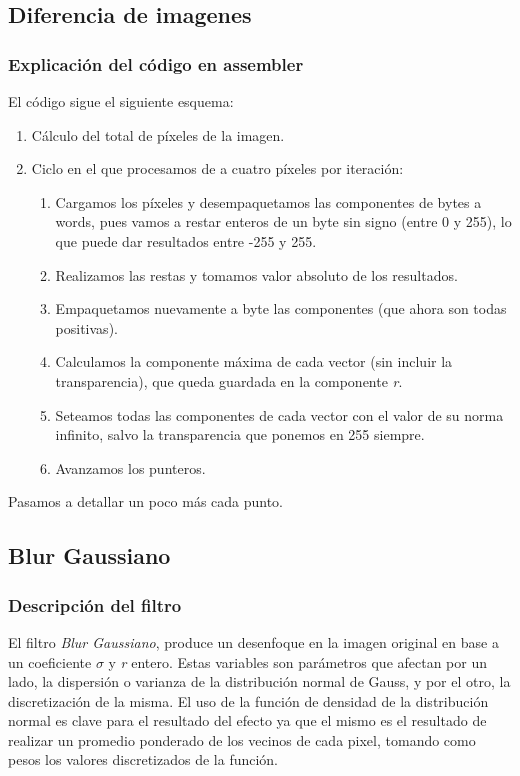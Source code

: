 \subsection{Diferencia de imagenes}

\subsubsection{Explicación del código en assembler}
El código sigue el siguiente esquema:
\begin{enumerate}
	\item Cálculo del total de píxeles de la imagen.
	\item Ciclo en el que procesamos de a cuatro píxeles por iteración:
	\begin{enumerate}
		\item Cargamos los píxeles y desempaquetamos las componentes de bytes a words, pues vamos a restar enteros de un byte sin signo (entre 0 y 255), lo que puede dar resultados entre -255 y 255.
		\item Realizamos las restas y tomamos valor absoluto de los resultados.
		\item Empaquetamos nuevamente a byte las componentes (que ahora son todas positivas).
		\item Calculamos la componente máxima de cada vector (sin incluir la transparencia), que queda guardada en la componente \emph{r}.
		\item Seteamos todas las componentes de cada vector con el valor de su norma infinito, salvo la transparencia que ponemos en 255 siempre. 
		\item Avanzamos los punteros.
	\end{enumerate}
\end{enumerate}

Pasamos a detallar un poco más cada punto.




\subsection{Blur Gaussiano}
\label{sec:blur_imp}

\subsubsection{Descripción del filtro}
\label{sec:blur_desc}

El filtro \textit{Blur Gaussiano}, produce un desenfoque en la imagen original
en base a un coeficiente $\sigma$ y \textit{r} entero. Estas variables son
parámetros que afectan por un lado, la dispersión o varianza de la distribución
normal de Gauss, y por el otro, la discretización de la misma. El uso de la
función de densidad de la distribución normal es clave para el resultado del
efecto ya que el mismo es el resultado de realizar un promedio ponderado de
los vecinos de cada pixel, tomando como pesos los valores discretizados de la
función.

